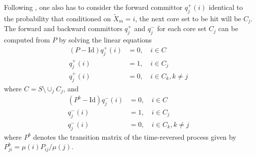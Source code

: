 \documentclass[journal=jctcce,manuscript=article]{achemso}
\newcommand{\fwd}[0]{+}
\newcommand{\bwd}[0]{-}
\newcommand{\id}{\mathrm{Id}}
\begin{document}
Following \cite{discreteTPT}, one also has to consider the forward committor $q^\fwd_j(i)$ identical to the probability  that conditioned on $\tilde X_m=i$, the next core set to be hit will be $C_j$.
The forward and backward committors $q^\fwd_j$ and $q^\bwd_j$  for each core set $C_j$ can be computed from $P$ by solving the linear equations \cite{discreteTPT}
\begin{align}
(P-\id) q^\fwd_j(i) & =  0, \quad i\in C\label{qfwd}\\
q^\fwd_j(i) & =  1,\quad i\in C_j\nonumber\\
q^\fwd_j(i) & =  0,\quad i\in C_k,k\not=j\nonumber
\end{align}
where $C=S\setminus\cup_j C_j$, and
\begin{align}
(P^b-\id) q^\bwd_j(i) & =  0, \quad i\in C\label{qbwd}\\
q^\bwd_j(i) & =  1,\quad i\in C_j\nonumber \\
q^\bwd_j(i) & =  0,\quad i\in C_k,k\not=j\nonumber
\end{align}
where $P^b$ denotes the transition matrix of the time-reversed process
given by $P^b_{ji}=\mu(i) P_{ij}/\mu(j)$.
\end{document}
